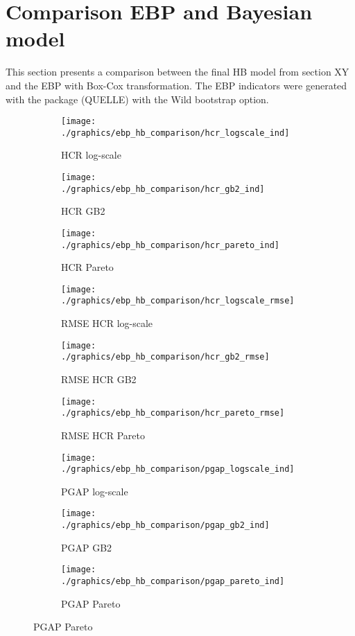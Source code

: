 \section{Comparison EBP and Bayesian model}

This section presents a comparison between the final HB model from section XY and the EBP with Box-Cox transformation.
The EBP indicators were generated with the package  (QUELLE) with the Wild bootstrap option.


\begin{figure}
    \begin{subfigure}{0.31\linewidth}
        \centering
        \texttt{[image: ./graphics/ebp\_hb\_comparison/hcr\_logscale\_ind]}
        \caption{HCR log-scale}
    \end{subfigure}
    \begin{subfigure}{0.31\linewidth}
        \centering
        \texttt{[image: ./graphics/ebp\_hb\_comparison/hcr\_gb2\_ind]}
        \caption{HCR GB2}
    \end{subfigure}
    \begin{subfigure}{0.31\linewidth}
        \centering
        \texttt{[image: ./graphics/ebp\_hb\_comparison/hcr\_pareto\_ind]}
        \caption{HCR Pareto}
    \end{subfigure}

    \begin{subfigure}{0.31\linewidth}
        \centering
        \texttt{[image: ./graphics/ebp\_hb\_comparison/hcr\_logscale\_rmse]}
        \caption{RMSE HCR log-scale}
    \end{subfigure}
    \begin{subfigure}{0.31\linewidth}
        \centering
        \texttt{[image: ./graphics/ebp\_hb\_comparison/hcr\_gb2\_rmse]}
        \caption{RMSE HCR GB2}
    \end{subfigure}
    \begin{subfigure}{0.31\linewidth}
        \centering
        \texttt{[image: ./graphics/ebp\_hb\_comparison/hcr\_pareto\_rmse]}
        \caption{RMSE HCR Pareto}
    \end{subfigure}

    \begin{subfigure}{0.31\linewidth}
        \centering
        \texttt{[image: ./graphics/ebp\_hb\_comparison/pgap\_logscale\_ind]}
        \caption{PGAP log-scale}
    \end{subfigure}
    \begin{subfigure}{0.31\linewidth}
        \centering
        \texttt{[image: ./graphics/ebp\_hb\_comparison/pgap\_gb2\_ind]}
        \caption{PGAP GB2}
    \end{subfigure}
    \begin{subfigure}{0.31\linewidth}
        \centering
        \texttt{[image: ./graphics/ebp\_hb\_comparison/pgap\_pareto\_ind]}
        \caption{PGAP Pareto}
    \end{subfigure}


\end{figure}
